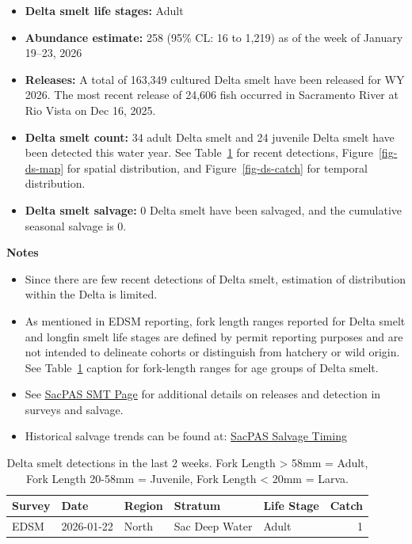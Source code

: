 \documentclass[
  letterpaper,
  DIV=11,
  numbers=noendperiod]{scrartcl}
\providecommand{\tightlist}{%
  \setlength{\itemsep}{0pt}\setlength{\parskip}{0pt}}
\begin{document}
\begin{itemize}
\item
  \textbf{Delta smelt life stages:} Adult
\item
  \textbf{Abundance estimate:} 258 (95\% CL: 16 to 1,219) as of the week
  of January 19--23, 2026
\item
  \textbf{Releases:} A total of 163,349 cultured Delta smelt have been
  released for WY 2026. The most recent release of 24,606 fish occurred
  in Sacramento River at Rio Vista on Dec 16, 2025.
\item
  \textbf{Delta smelt count:} 34 adult Delta smelt and 24 juvenile Delta
  smelt have been detected this water year. See
  Table~\ref{tbl-ds-recent-catch} for recent detections,
  Figure~\ref{fig-ds-map} for spatial distribution, and
  Figure~\ref{fig-ds-catch} for temporal distribution.
\item
  \textbf{Delta smelt salvage:} 0 Delta smelt have been salvaged, and
  the cumulative seasonal salvage is 0.
\end{itemize}

\textbf{Notes}

\begin{itemize}
\tightlist
\item
  Since there are few recent detections of Delta smelt, estimation of
  distribution within the Delta is limited.
\item
  As mentioned in EDSM reporting, fork length ranges reported for Delta
  smelt and longfin smelt life stages are defined by permit reporting
  purposes and are not intended to delineate cohorts or distinguish from
  hatchery or wild origin. See Table~\ref{tbl-ds-recent-catch} caption
  for fork-length ranges for age groups of Delta smelt.
\item
  See
  \href{https://www.cbr.washington.edu/sacramento/workgroups/delta_smelt.html}{SacPAS
  SMT Page} for additional details on releases and detection in surveys
  and salvage.
\item
  Historical salvage trends can be found at:
  \href{https://www.cbr.washington.edu/sacramento/data/query_salvage_hrt.html}{SacPAS
  Salvage Timing}
\end{itemize}

\begin{longtable}[]{@{}lllllr@{}}

\caption{\label{tbl-ds-recent-catch}Delta smelt detections in the last 2
weeks. Fork Length \textgreater{} 58mm = Adult, Fork Length 20-58mm =
Juvenile, Fork Length \textless{} 20mm = Larva.}

\tabularnewline

\toprule\noalign{}
Survey & Date & Region & Stratum & Life Stage & Catch \\
\midrule\noalign{}
\endhead
\bottomrule\noalign{}
\endlastfoot
EDSM & 2026-01-22 & North & Sac Deep Water & Adult & 1 \\

\end{longtable}
\end{document}
